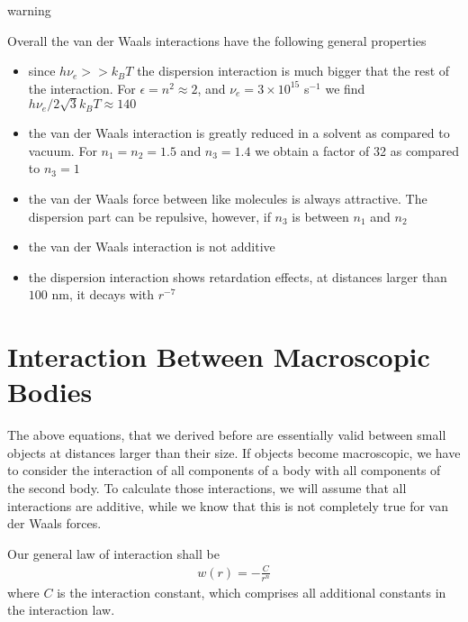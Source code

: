 \documentclass[letterpaper,10pt,english]{sphinxmanual}
\begin{document}
\begin{sphinxadmonition}{warning}{}\unskip
\sphinxAtStartPar
{}

\sphinxAtStartPar
Overall the van der Waals interactions have the following general properties
\begin{itemize}
\item {} 
\sphinxAtStartPar
since \(h\nu_e >>k_B T\) the dispersion interaction is much bigger that the rest of the interaction. For \(\epsilon=n^2\approx 2\), and \(\nu_e=3\times 10^{15}\) s\(^{-1}\) we find \(h\nu_e/2\sqrt{3}k_B T\approx 140\)

\item {} 
\sphinxAtStartPar
the van der Waals interaction is greatly reduced in a solvent as compared to vacuum. For \(n_1=n_2=1.5\) and \(n_3=1.4\) we obtain a factor of 32 as compared to \(n_3=1\)

\item {} 
\sphinxAtStartPar
the van der Waals force between like molecules is always attractive. The dispersion part can be repulsive, however, if \(n_3\) is between \(n_1\) and \(n_2\)

\item {} 
\sphinxAtStartPar
the van der Waals interaction is not additive

\item {} 
\sphinxAtStartPar
the dispersion interaction shows retardation effects, at distances larger than \(100\) nm, it decays with \(r^{-7}\)

\end{itemize}
\end{sphinxadmonition}


\section{Interaction Between Macroscopic Bodies}
\label{\detokenize{notebooks/L11/1_van_der_Waals:Interaction-Between-Macroscopic-Bodies}}
\sphinxAtStartPar
The above equations, that we derived before are essentially valid between small objects at distances larger than their size. If objects become macroscopic, we have to consider the interaction of all components of a body with all components of the second body. To calculate those interactions, we will assume that all interactions are additive, while we know that this is not completely true for van der Waals forces.

\sphinxAtStartPar
Our general law of interaction shall be
\begin{equation*}
\begin{split}w(r)=-\frac{C}{r^n}\end{split}
\end{equation*}
\sphinxAtStartPar
where \(C\) is the interaction constant, which comprises all additional constants in the interaction law.
\end{document}
